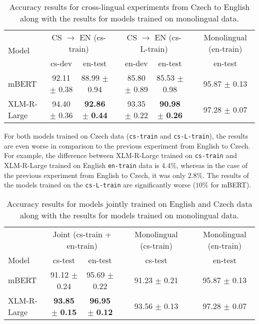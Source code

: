 \documentclass[10pt, a4paper]{article}
\begin{document}
\begin{table*}[h!]
\begin{adjustbox}{width=0.82\linewidth,center}
\begin{tabular}{lccccccc} \toprule
 \multirow{2}{*}{Model}             & \multicolumn{2}{c}{CS $\rightarrow$ EN (cs-train)} & & \multicolumn{2}{c}{CS $\rightarrow$ EN (cs-L-train)}  & & \multicolumn{1}{c}{Monolingual (en-train)} \\ \cline{2-3} \cline{5-6} \cline{8-8}
     & cs-dev           & en-test    &      & en-dev           & en-test       &  & en-test         \\ \midrule
mBERT & 92.11 $\pm$ 0.38     & 88.99 $\pm$ 0.94 &      &        85.80 $\pm$ 0.89                   &    85.53 $\pm$ 0.98            & &  95.87 $\pm$ 0.13  \\
XLM-R-Large & 94.40 $\pm$ 0.36     & \textbf{92.86} $\pm$ \textbf{0.44} & &         93.35 $\pm$ 0.22                     &       \textbf{90.98} $\pm$ \textbf{0.26}           &  &  97.28 $\pm$ 0.07  \\ \bottomrule
\end{tabular}
\end{adjustbox}
\caption{Accuracy results for cross-lingual experiments from Czech to English along with the results for models trained on monolingual data.} \label{tab:crosslingual-cs-en}
\end{table*}

\par For both models trained on Czech data (\texttt{cs-train} and \texttt{cs-L-train}), the results are even worse in comparison to the previous experiment from English to Czech. For example, the difference between XLM-R-Large trained on \texttt{cs-train} and XLM-R-Large trained on English \texttt{en-train} data is $4.4\%$, whereas in the case of the previous experiment from English to Czech, it was only $2.8\%$. The results of the models trained on the \texttt{cs-L-train} are significantly worse ($10\%$ for mBERT).


\begin{table*}[ht!]
\begin{adjustbox}{width=0.82\linewidth,center}
\begin{tabular}{lcccccc} \toprule
            & \multicolumn{2}{c}{Joint (cs-train + en-train)} && \multicolumn{1}{c}{Monolingual (cs-train)} &&  Monolingual (en-train) \\ \cline{2-3} \cline{5-5} \cline{7-7}
Model       & cs-test        & en-test       && cs-test            && en-test             \\ \midrule
mBERT       & 91.12 $\pm$ 0.24   & 95.69 $\pm$ 0.22  && 91.23 $\pm$ 0.21 && 95.87 $\pm$ 0.13 \\
XLM-R-Large & \textbf{93.85} $\pm$ \textbf{0.15}   & \textbf{96.95} $\pm$ \textbf{0.12}  && 93.56 $\pm$ 0.13 && 97.28 $\pm$ 0.07 \\ \bottomrule
\end{tabular}
\end{adjustbox}
\caption{Accuracy results for models jointly trained on English and Czech data along with the results for models trained on monolingual data.} \label{tab:crosslingual-joint}
\end{table*}
\end{document}
